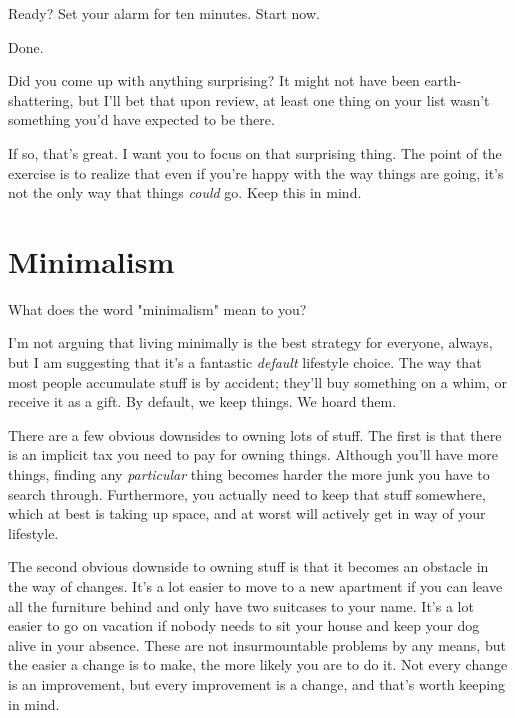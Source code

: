 \documentclass[]{book}
\begin{document}
Ready? Set your alarm for ten minutes. Start now.

Done.

Did you come up with anything surprising? It might not have been
earth-shattering, but I'll bet that upon review, at least one thing on your list
wasn't something you'd have expected to be there.

If so, that's great. I want you to focus on that surprising thing. The point of
the exercise is to realize that even if you're happy with the way things are
going, it's not the only way that things \emph{could} go. Keep this in mind.


\chapter{Minimalism}

What does the word "minimalism" mean to you?


I'm not arguing that living minimally is the best strategy for everyone, always,
but I am suggesting that it's a fantastic \emph{default} lifestyle choice. The
way that most people accumulate stuff is by accident; they'll buy something on a
whim, or receive it as a gift. By default, we keep things. We hoard them.

There are a few obvious downsides to owning lots of stuff. The first is that
there is an implicit tax you need to pay for owning things. Although you'll have
more things, finding any \emph{particular} thing becomes harder the more junk
you have to search through. Furthermore, you actually need to keep that stuff
somewhere, which at best is taking up space, and at worst will actively get in
way of your lifestyle.

The second obvious downside to owning stuff is that it becomes an obstacle in
the way of changes. It's a lot easier to move to a new apartment if you can
leave all the furniture behind and only have two suitcases to your name. It's a
lot easier to go on vacation if nobody needs to sit your house and keep your dog
alive in your absence. These are not insurmountable problems by any means, but
the easier a change is to make, the more likely you are to do it. Not every
change is an improvement, but every improvement is a change, and that's worth
keeping in mind.
\end{document}
